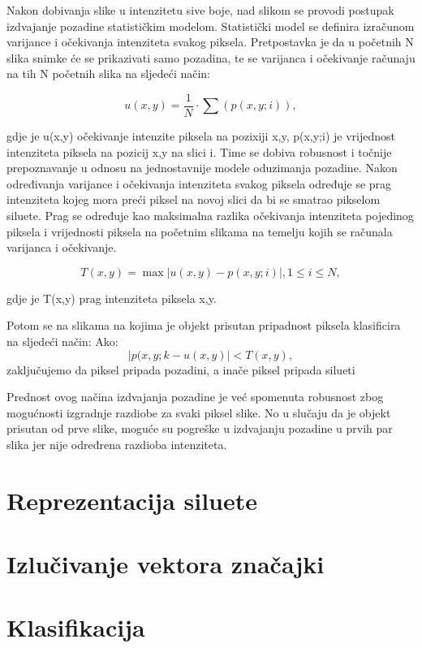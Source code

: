 \documentclass[times, utf8, diplomski]{fer}
\begin{document}
Nakon dobivanja slike u intenzitetu sive boje, nad slikom se provodi postupak izdvajanje pozadine statističkim modelom. Statistički model se definira izračunom varijance i očekivanja intenziteta svakog piksela. Pretpostavka je da u početnih N slika snimke će se prikazivati samo pozadina, te se varijanca i očekivanje računaju na tih N početnih slika na sljedeći način:

	$$u(x,y) = \frac{1}{N} \cdot  \sum (p(x,y;i)),$$

\vspace{0.4cm}

gdje je u(x,y) očekivanje intenzite piksela na pozixiji x,y, p(x,y;i) je vrijednost intenziteta piksela na pozicij x,y na slici i. Time se dobiva robusnost i točnije prepoznavanje u odnosu na jednostavnije modele oduzimanja pozadine. Nakon određivanja varijance i očekivanja intenziteta svakog piksela određuje se prag intenziteta kojeg mora preći piksel na novoj slici da bi se smatrao pikselom siluete. Prag se određuje kao maksimalna razlika očekivanja intenziteta pojedinog piksela i vrijednosti piksela na početnim slikama na temelju kojih se računala varijanca i očekivanje.

$$T(x,y) = \max{ \big|u(x,y) - p(x,y;i)\big|}, 1 \leq i \leq N,$$

gdje je T(x,y) prag intenziteta piksela x,y.

Potom se na slikama na kojima je objekt prisutan pripadnost piksela klasificira na sljedeći način:
\newline
  Ako: 
  $$ \big|p(x,y;k - u(x,y)\big| < T(x,y),$$
      zaključujemo da piksel pripada pozadini,
  a inače piksel pripada silueti
      
Prednost ovog načina izdvajanja pozadine je već spomenuta robusnost zbog mogućnosti izgradnje razdiobe za svaki piksel slike. No u slučaju da je objekt prisutan od prve slike, moguće su pogreške u izdvajanju pozadine u prvih par slika jer nije određrena razdioba intenziteta.


\section{Reprezentacija siluete}

\section{Izlučivanje vektora značajki}

\section{Klasifikacija}
\end{document}
